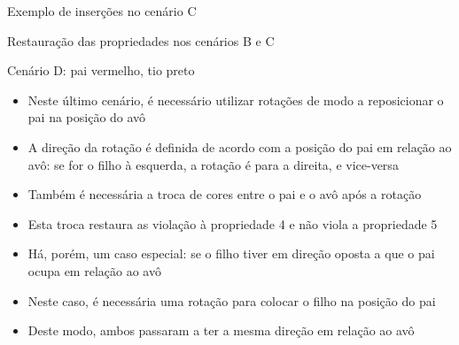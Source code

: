 \begin{frame}[fragile]{Exemplo de inserções no cenário C}


\end{frame}

\begin{frame}[fragile]{Restauração das propriedades nos cenários B e C}
\end{frame}

\begin{frame}[fragile]{Cenário D: pai vermelho, tio preto}

    \begin{itemize}
        \item Neste último cenário, é necessário utilizar rotações de modo a reposicionar
            o pai na posição do avô

        \item A direção da rotação é definida de acordo com a posição do pai em relação ao 
            avô: se for o filho à esquerda, a rotação é para a direita, e vice-versa

        \item Também é necessária a troca de cores entre o pai e o avô após a rotação

        \item Esta troca restaura as violação à propriedade 4 e não viola a propriedade 5

        \item Há, porém, um caso especial: se o filho tiver em direção oposta a que o pai ocupa
            em relação ao avô

       \item Neste caso, é necessária uma rotação para colocar o filho na posição do pai

       \item Deste modo, ambos passaram a ter a mesma direção em relação ao avô
    \end{itemize}

\end{frame}

